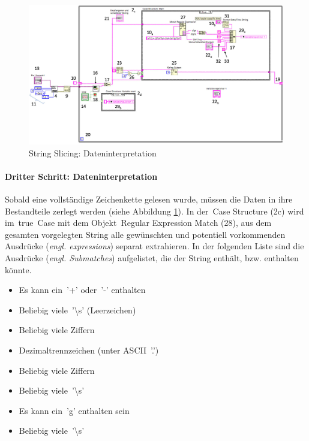 {%

\begin{figure}
    \centering
    \includegraphics[width=1.04\textwidth]{Bilder/LabVIEW_serialport/step7_stringslicing.jpg}
    \caption[\glqq String Slicing\grqq{}: Dateninterpretation]{\glqq String Slicing\grqq{}: Dateninterpretation}
    \label{step7}
\end{figure}

\paragraph{Dritter Schritt: \glqq Dateninterpretation\grqq{}} Sobald eine vollständige Zeichenkette gelesen wurde, müssen die Daten in ihre Bestandteile zerlegt werden (siehe Abbildung \ref{step7}). In der \,{\Menlo Case Structure} (2c) wird im \,{\Menlo true}\, Case mit dem Objekt \,{\Menlo Regular Expression Match} (28), aus dem gesamten vorgelegten String alle gewünschten und potentiell vorkommenden Ausdrücke (\textit{engl. expressions}) separat extrahieren. In der folgenden Liste sind die Ausdrücke (\textit{engl. Submatches}) aufgelistet, die der String enthält, bzw. enthalten könnte.

\newpage 

\begin{itemize} %
\singlespacing
\item Es kann ein \,{\Menlo '+'} oder \,{\Menlo '-'} enthalten
\item Beliebig viele \,{\Menlo '\textbackslash s'} (Leerzeichen)
\item Beliebig viele Ziffern
\item Dezimaltrennzeichen (unter ASCII \,{\Menlo '.'})
\item Beliebig viele Ziffern
\item Beliebig viele \,{\Menlo '\textbackslash s'}
\item Es kann ein \,{\Menlo 'g'} enthalten sein
\item Beliebig viele \,{\Menlo '\textbackslash s'}
\end{itemize}


}
